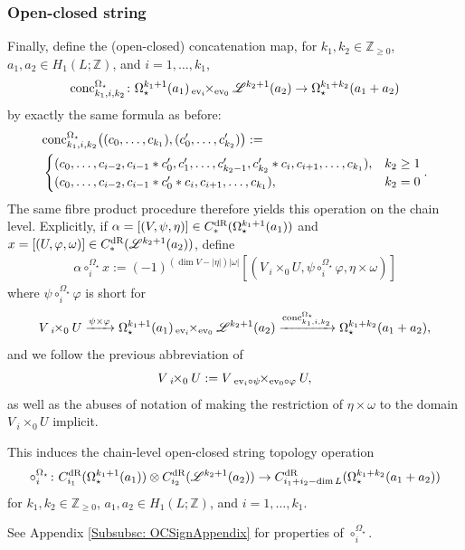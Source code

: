 \documentclass[10pt]{amsart}
\numberwithin{equation}{section}
\theoremstyle{plain}
\theoremstyle{definition}
\theoremstyle{remark}
\numberwithin{equation}{section}
\newcommand{\Z}{\mathbb{Z}}
\newcommand{\ev}{\textup{ev}}
\newcommand{\dR}{\textup{dR}}
\newcommand{\fiberprod}[2]{\,_{#1}\!\!\times_{#2} }
\newcommand{\concOmega}{\textup{conc}^{\Omega_\star}}
\begin{document}
{\subsubsection{Open-closed string}
Finally, define the (open-closed) concatenation map, for $k_1,k_2\in \Z_{\geq 0}$, $a_1,a_2\in H_1(L;\Z)$, and $i=1,\dots, k_1$, 
\[\concOmega_{k_1,i,k_2}\colon \Omega^{k_1+1}_\star (a_1) \fiberprod{\ev_i}{\ev_0}\mathscr{L}^{k_2+1}(a_2)\to \Omega^{k_1+k_2}_\star (a_1+a_2)
\] by exactly the same formula as before:
	\begin{align*}
		&\concOmega_{k_1,i,k_2}\big((c_0,\dots, c_{k_1}), (c_0',\dots, c_{k_2}')\big) :=\\
		& \begin{cases}
			(c_0,\dots, c_{i-2}, c_{i-1}*c_0', c_1',\dots, c'_{k_2-1},c'_{k_2}* c_i, c_{i+1},\dots, c_{k_1}), & k_2\geq 1\\
			(c_0, \dots, c_{i-2}, c_{i-1}*c_0'*c_i,c_{i+1},\dots, c_{k_1}), & k_2=0
		\end{cases}.
	\end{align*}
The same fibre product procedure therefore yields this operation on the chain level. 
Explicitly, if $\alpha=[(V,\psi, \eta)]\in C_*^\dR(\Omega_\star^{k_1+1}(a_1))$ and  $x=[(U,\varphi, \omega)] \in C_*^\dR(\mathscr{L}^{k_2+1}(a_2))$, define 
\begin{align}\label{Eq: PartialOCprod}
	\alpha\circ_i^{\Omega_\star} x:= (-1)^{(\dim V-|\eta|)|\omega|}[( V\fiberprod{i}{0}U, \psi \circ_i^{\Omega_\star} \varphi, \eta\times \omega )]
\end{align}
where $\psi\circ_i^{\Omega_\star} \varphi$ is short for
\[
	V\fiberprod{i}{0} U \xrightarrow{\psi\times \varphi}\Omega_\star^{k_1+1}(a_1)\fiberprod{\ev_i}{\ev_0}\mathscr{L}^{k_2+1}(a_2)\xrightarrow{\concOmega_{k_1,i,k_2}}\Omega_\star^{k_1+k_2}(a_1+a_2),
\]
and we follow the previous abbreviation of \[V\fiberprod{i}{0} U:= V\fiberprod{\ev_i\circ \psi}{\ev_0\circ \varphi} U,\] as well as the abuses of notation of making the restriction of $\eta\times \omega$ to the domain $V\fiberprod{i}{0}U$ implicit.


This induces the chain-level open-closed string topology operation 
\[
	\circ_i^{\Omega_\star} \colon C_{i_1}^\dR(\Omega_\star^{k_1+1}(a_1))\otimes C_{i_2}^\dR(\mathscr{L}^{k_2+1}(a_2))\to C_{i_1+i_2-\dim L}^\dR(\Omega_\star^{k_1+k_2}(a_1+a_2))
\]
for $k_1,k_2\in \Z_{\geq 0}$, $a_1,a_2\in H_1(L;\Z)$, and $i=1,\dots, k_1$.

See Appendix \ref{Subsubsc: OCSignAppendix} for properties of $\circ_i^{\Omega_\star}$.


}
\end{document}
